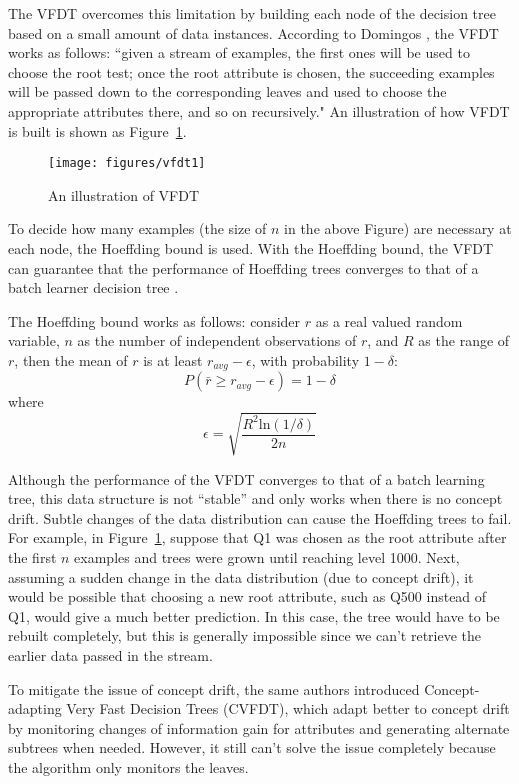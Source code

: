 \documentclass[conference]{IEEEtran}
\begin{document}
		The VFDT overcomes this limitation by building each node of the decision tree based on a small amount of data instances. According to Domingos \cite{VFDT}, the VFDT works as follows: ``given a stream of examples, the first ones will be used to choose the root test; once the root attribute is chosen, the succeeding examples will be passed down to the corresponding leaves and used to choose the appropriate attributes there, and so on recursively." An illustration of how VFDT is built is shown as Figure~\ref{fig:VFDT}.
		
		\begin{figure}[H]
			\centering
			\texttt{[image: figures/vfdt1]} 
			\caption{An illustration of VFDT}
			\label{fig:VFDT}
		\end{figure}
		To decide how many examples (the size of $n$ in the above Figure) are necessary at each node, the Hoeffding bound is used. With the Hoeffding bound, the VFDT can guarantee that the performance of Hoeffding trees converges to that of a batch learner decision tree \cite{VFDT}.
		
		The Hoeffding bound works as follows: consider $r$ as a real valued random variable, $n$ as the number of independent observations of $r$, and $R$ as the range of $r$, then the mean of $r$ is at least $r_{avg}-\epsilon$, with probability $1-\delta$: 
		$$P(\bar{r} \geq r_{avg}-\epsilon) = 1-\delta$$ where $$ \epsilon=\sqrt{\frac{R^2 \text{ln}(1/\delta)}{2n}}$$
		
		Although the performance of the VFDT converges to that of a batch learning tree, this data structure is not ``stable'' and only works when there is no concept drift. Subtle changes of the data distribution can cause the Hoeffding trees to fail. For example, in Figure~\ref{fig:VFDT}, suppose that Q1 was chosen as the root attribute after the first $n$ examples and trees were grown until reaching level 1000. Next, assuming a sudden change in the data distribution (due to concept drift), it would be possible that choosing a new root attribute, such as Q500 instead of Q1, would give a much better prediction. In this case, the tree would have to be rebuilt completely, but this is generally impossible since we can't retrieve the earlier data passed in the stream.
		
		To mitigate the issue of concept drift, the same authors introduced Concept-adapting Very Fast Decision Trees (CVFDT), which adapt better to concept drift by monitoring changes of information gain for attributes and generating alternate subtrees when needed. However, it still can't solve the issue completely because the algorithm only monitors the leaves.
		
\end{document}
